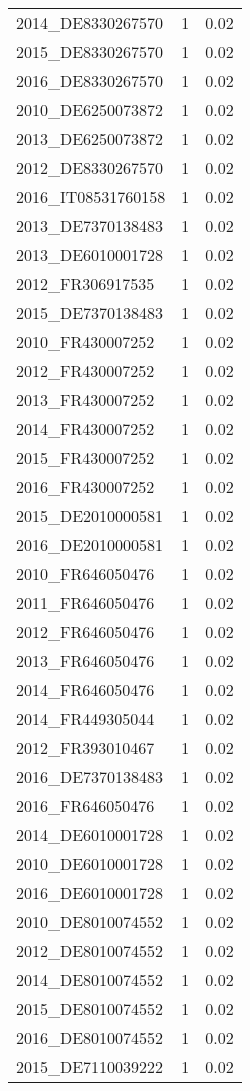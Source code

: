 \begin{table*}[htbp]
\begin{tabular}{lrr}
2014_DE8330267570 & 1 & 0.02 \\
2015_DE8330267570 & 1 & 0.02 \\
2016_DE8330267570 & 1 & 0.02 \\
2010_DE6250073872 & 1 & 0.02 \\
2013_DE6250073872 & 1 & 0.02 \\
2012_DE8330267570 & 1 & 0.02 \\
2016_IT08531760158 & 1 & 0.02 \\
2013_DE7370138483 & 1 & 0.02 \\
2013_DE6010001728 & 1 & 0.02 \\
2012_FR306917535 & 1 & 0.02 \\
2015_DE7370138483 & 1 & 0.02 \\
2010_FR430007252 & 1 & 0.02 \\
2012_FR430007252 & 1 & 0.02 \\
2013_FR430007252 & 1 & 0.02 \\
2014_FR430007252 & 1 & 0.02 \\
2015_FR430007252 & 1 & 0.02 \\
2016_FR430007252 & 1 & 0.02 \\
2015_DE2010000581 & 1 & 0.02 \\
2016_DE2010000581 & 1 & 0.02 \\
2010_FR646050476 & 1 & 0.02 \\
2011_FR646050476 & 1 & 0.02 \\
2012_FR646050476 & 1 & 0.02 \\
2013_FR646050476 & 1 & 0.02 \\
2014_FR646050476 & 1 & 0.02 \\
2014_FR449305044 & 1 & 0.02 \\
2012_FR393010467 & 1 & 0.02 \\
2016_DE7370138483 & 1 & 0.02 \\
2016_FR646050476 & 1 & 0.02 \\
2014_DE6010001728 & 1 & 0.02 \\
2010_DE6010001728 & 1 & 0.02 \\
2016_DE6010001728 & 1 & 0.02 \\
2010_DE8010074552 & 1 & 0.02 \\
2012_DE8010074552 & 1 & 0.02 \\
2014_DE8010074552 & 1 & 0.02 \\
2015_DE8010074552 & 1 & 0.02 \\
2016_DE8010074552 & 1 & 0.02 \\
2015_DE7110039222 & 1 & 0.02 \\

\end{tabular}
\end{table*}
